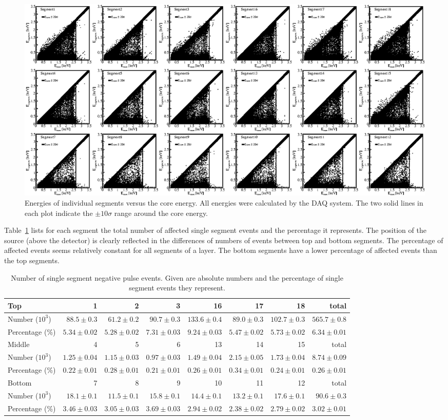 \begin{figure}
\centering
\includegraphics{EnegPuls}
\caption{Energies of individual segments versus the core energy. All
energies were calculated by the DAQ system. The two solid lines in
each plot indicate the $\pm 10 \sigma$ range around the core energy.}
\label{fig:np:EnegPulse}
\end{figure}

Table~\ref{tab:np:nenum} lists for each segment the total number of
affected single segment events and the percentage it represents. The
position of the source (above the detector) is clearly reflected in
the differences of numbers of events between top and bottom segments.
The percentage of affected events seems relatively constant for all
segments of a layer. The bottom segments have a lower percentage of
affected events than the top segments.

\begin{table}[tbhp]
\centering
\caption{Number of single segment negative pulse events. Given are 
absolute numbers and the percentage of single segment events
they represent.}
\label{tab:np:nenum}
\scriptsize
\begin{tabular}{l|rrr|rrr|r} \hline
Top  & 1 & 2 & 3 & 16 & 17 & 18 & total \\\hline
Number ($10^{3}$) &$88.5\pm0.3$&$61.2\pm0.2$&$90.7\pm0.3$&$133.6\pm0.4$&$89.0\pm0.3$&$102.7\pm0.3$&$565.7\pm0.8$\\ 
Percentage (\%) &$5.34\pm0.02$&$5.28\pm0.02$&$7.31\pm0.03$&$9.24\pm0.03$&$5.47\pm0.02$&$5.73\pm0.02$&$6.34\pm0.01$\\
\hline Middle& 4 & 5 & 6 & 13 & 14 & 15 & total \\\hline
Number ($10^{3}$) &$1.25\pm0.04$&$1.15\pm0.03$&$0.97\pm0.03$&$1.49\pm0.04$&$2.15\pm0.05$&$1.73\pm0.04$&$8.74\pm0.09$\\ 
Percentage (\%) &$0.22\pm0.01$&$0.28\pm0.01$&$0.21\pm0.01$&$0.26\pm0.01$&$0.34\pm0.01$&$0.24\pm0.01$&$0.26\pm0.01$\\
\hline Bottom& 7 & 8 & 9 & 10 & 11 & 12 & total \\\hline
Number ($10^{3}$) &$18.1\pm0.1$&$11.5\pm0.1$&$15.8\pm0.1$&$14.4\pm0.1$&$13.2\pm0.1$&$17.6\pm0.1$&$90.6\pm0.3$\\ 
Percentage (\%) &$3.46\pm0.03$&$3.05\pm0.03$&$3.69\pm0.03$&$2.94\pm0.02$&$2.38\pm0.02$&$2.79\pm0.02$&$3.02\pm0.01$\\ \hline 
\end{tabular}
\end{table}

